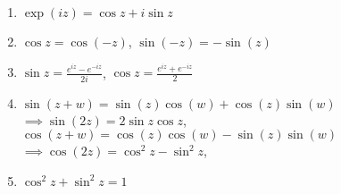  {
    \begin{enumerate}[label=(\arabic*)]
        \item $\exp(iz)=\cos z+i\sin z$
        \item $\cos z = \cos(-z)$, $\sin(-z) = - \sin(z)$
        \item $\sin z = \frac{e^{iz}-e^{-iz}}{2i}$, $\cos z = \frac{e^{iz}+e^{-iz}}{2}$
        \item $\sin(z + w) = \sin(z) \cos(w) + \cos(z) \sin(w)$\\
              $\implies \sin(2z)=2\sin z\cos z$,\\
              $\cos(z + w) = \cos(z) \cos(w) - \sin(z) \sin(w)$\\
              $\implies \cos(2z)=\cos^2z-\sin^2z$,
        \item $\cos^2z+\sin^2z=1$
    \end{enumerate}
}